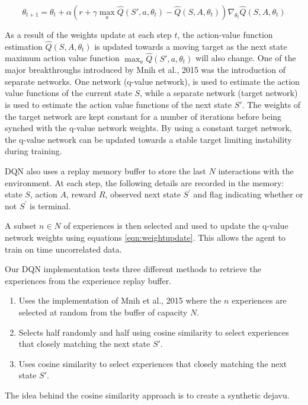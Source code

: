 \documentclass{article}
\begin{document}
\begin{equation}
\label{eqn:weightupdate}
\theta_{t+1} = \theta_{t} + \alpha \left( r + \gamma \max_{a} \hat{Q}(S',a,\theta_{t}) - \hat{Q}(S,A,\theta_{t}) \right) \nabla_{\theta_{t}} \hat{Q}(S,A,\theta_{t})
\end{equation}

As a result of the weights update at each step $t$, the action-value function estimation $\hat{Q}(S, A,\theta_{t})$ is updated towards a moving target as the next state maximum action value function $\max_{a} \hat{Q}(S',a,\theta_{t})$ will also change. One of the major breakthroughs introduced by Mnih et al., 2015 was the introduction of separate networks. One network (q-value network), is used to estimate the action value functions of the current state $S$, while a separate network (target network) is used to estimate the action value functions of the next state $S'$. The weights of the target network are kept constant for a number of iterations before being synched with the q-value network weights. By using a constant target network, the q-value network can be updated towards a stable target limiting instability during training.

DQN also uses a replay memory buffer to store the last $N$ interactions with the environment. At each step, the following details are recorded in the memory: state $S$, action $A$, reward $R$, observed next state $S^\prime$ and flag indicating whether or not $S^\prime$ is terminal.

A subset $n \in N$ of experiences is then selected and used to update the q-value network weights using equations \ref{eqn:weightupdate}. This allows the agent to train on time uncorrelated data.

Our DQN implementation tests three different methods to retrieve the experiences from the experience replay buffer.
\begin{enumerate}
  \item Uses the implementation of Mnih et al., 2015 where the $n$ experiences are selected at random from the buffer of capacity $N$.
  \item Selects half randomly and half using cosine similarity to select experiences that closely matching the next state $S'$.
  \item Uses cosine similarity to select experiences that closely matching the next state $S'$.
\end{enumerate}
The idea behind the cosine similarity approach is to create a synthetic dejavu.
\end{document}

